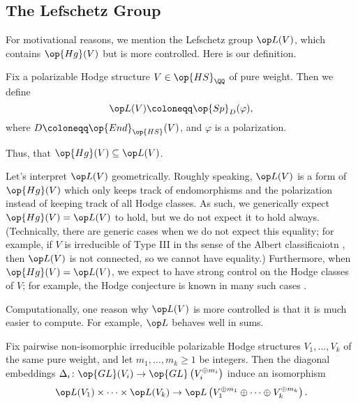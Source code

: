 \documentclass[../thesis.tex]{subfiles}
\begin{document}
\subsection{The Lefschetz Group}
For motivational reasons, we mention the Lefschetz group $\op L(V)$, which contains $\op{Hg}(V)$ but is more controlled. Here is our definition.
\begin{definition}
	Fix a polarizable Hodge structure $V\in\op{HS}_\QQ$ of pure weight. Then we define
	\[\op L(V)\coloneqq\op{Sp}_D(\varphi),\]
	where $D\coloneqq\op{End}_{\op{HS}}(V)$, and $\varphi$ is a polarization.
\end{definition}
Thus,  that $\op{Hg}(V)\subseteq\op L(V)$.
\begin{remark}
	Let's interpret $\op L(V)$ geometrically. Roughly speaking, $\op L(V)$ is a form of $\op{Hg}(V)$ which only keeps track of endomorphisms and the polarization instead of keeping track of all Hodge classes. As such, we generically expect $\op{Hg}(V)=\op L(V)$ to hold, but we do not expect it to hold always. (Technically, there are generic cases when we do not expect this equality; for example, if $V$ is irreducible of Type III in ths sense of the Albert classificaiotn , then $\op L(V)$ is not connected, so we cannot have equality.) Furthermore, when $\op{Hg}(V)=\op L(V)$, we expect to have strong control on the Hodge classes of $V$; for example, the Hodge conjecture is known in many such cases \cite[Theorem~3.1]{murty-exceptional}.
\end{remark}
Computationally, one reason why $\op L(V)$ is more controlled is that it is much easier to compute. For example, $\op L$ behaves well in sums.
\begin{lemma} \label{lem:lefschetz-sums}
	Fix pairwise non-isomorphic irreducible polarizable Hodge structures $V_1,\ldots,V_k$ of the same pure weight, and let $m_1,\ldots,m_k\ge1$ be integers. Then the diagonal embeddings $\Delta_i\colon\op{GL}(V_i)\to\op{GL}\left(V_i^{\oplus m_i}\right)$ induce an isomorphism
	\[\op L(V_1)\times\cdots\times\op L(V_k)\to\op L\left(V_1^{\oplus m_1}\oplus\cdots\oplus V_k^{\oplus m_k}\right).\]
\end{lemma}
\end{document}
